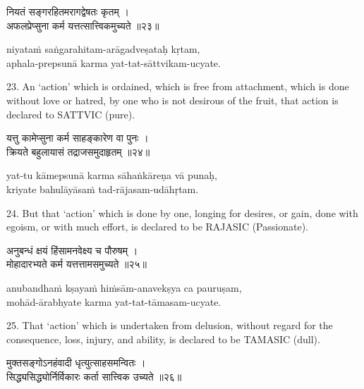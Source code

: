 \begin{gitaverse}
नियतं सङ्गरहितमरागद्वेषतः कृतम् । \\
अफलप्रेप्सुना कर्म यत्तत्सात्त्विकमुच्यते ॥२३॥
\end{gitaverse}

\begin{transliteration}
niyataṁ saṅgarahitam-arāgadveṣataḥ kṛtam, \\
aphala-prepsunā karma yat-tat-sāttvikam-ucyate.
\end{transliteration}

23. An `action' which is ordained, which is free from attachment, which is done
without love or hatred, by one who is not desirous of the fruit, that action is
declared to SATTVIC (pure).

\begin{gitaverse}
यत्तु कामेप्सुना कर्म साहङ्कारेण वा पुनः । \\
क्रियते बहुलायासं तद्राजसमुदाहृतम् ॥२४॥
\end{gitaverse}

\begin{transliteration}
yat-tu kāmepsunā karma sāhaṅkāreṇa vā punaḥ, \\
kriyate bahulāyāsaṁ tad-rājasam-udāhṛtam.
\end{transliteration}

24. But that `action' which is done by one, longing for desires, or gain, done
with egoism, or with much effort, is declared to be RAJASIC (Passionate).

\begin{gitaverse}
अनुबन्धं क्षयं हिंसामनवेक्ष्य च पौरुषम् । \\
मोहादारभ्यते कर्म यत्तत्तामसमुच्यते ॥२५॥
\end{gitaverse}

\begin{transliteration}
anubandhaṁ kṣayaṁ hiṁsām-anavekṣya ca pauruṣam, \\
mohād-ārabhyate karma yat-tat-tāmasam-ucyate.
\end{transliteration}

25. That `action' which is undertaken from delusion, without regard for the
consequence, loss, injury, and ability, is declared to be TAMASIC (dull).

\begin{gitaverse}
मुक्तसङ्गोऽनहंवादी धृत्युत्साहसमन्वितः । \\
सिद्ध्यसिद्ध्योर्निर्विकारः कर्ता सात्त्विक उच्यते ॥२६॥
\end{gitaverse}

